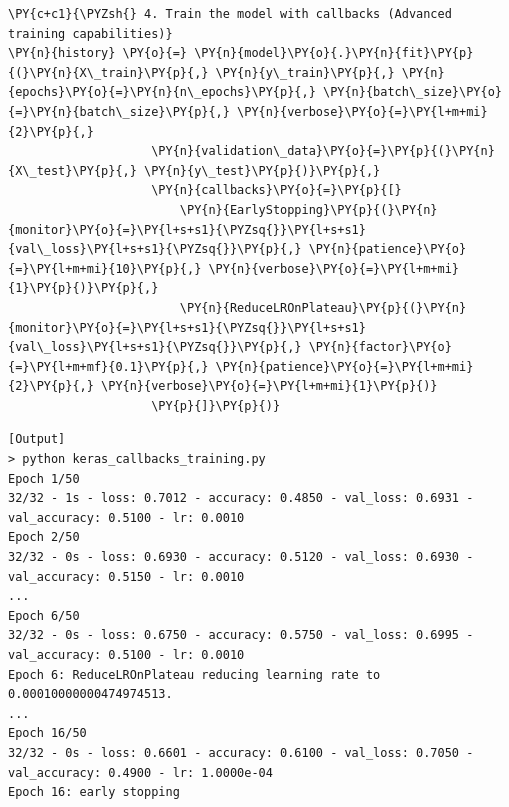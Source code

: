 \begin{Verbatim}[fontsize=\footnotesize, label=\makebox{\url{https://github.com/lucabaldini/cmepda/tree/master/slides/latex/snippets/keras_callbacks_training.py}},commandchars=\\\{\}]
\PY{c+c1}{\PYZsh{} 4. Train the model with callbacks (Advanced training capabilities)}
\PY{n}{history} \PY{o}{=} \PY{n}{model}\PY{o}{.}\PY{n}{fit}\PY{p}{(}\PY{n}{X\_train}\PY{p}{,} \PY{n}{y\_train}\PY{p}{,} \PY{n}{epochs}\PY{o}{=}\PY{n}{n\_epochs}\PY{p}{,} \PY{n}{batch\_size}\PY{o}{=}\PY{n}{batch\_size}\PY{p}{,} \PY{n}{verbose}\PY{o}{=}\PY{l+m+mi}{2}\PY{p}{,}
                    \PY{n}{validation\_data}\PY{o}{=}\PY{p}{(}\PY{n}{X\_test}\PY{p}{,} \PY{n}{y\_test}\PY{p}{)}\PY{p}{,}
                    \PY{n}{callbacks}\PY{o}{=}\PY{p}{[}
                        \PY{n}{EarlyStopping}\PY{p}{(}\PY{n}{monitor}\PY{o}{=}\PY{l+s+s1}{\PYZsq{}}\PY{l+s+s1}{val\_loss}\PY{l+s+s1}{\PYZsq{}}\PY{p}{,} \PY{n}{patience}\PY{o}{=}\PY{l+m+mi}{10}\PY{p}{,} \PY{n}{verbose}\PY{o}{=}\PY{l+m+mi}{1}\PY{p}{)}\PY{p}{,}
                        \PY{n}{ReduceLROnPlateau}\PY{p}{(}\PY{n}{monitor}\PY{o}{=}\PY{l+s+s1}{\PYZsq{}}\PY{l+s+s1}{val\_loss}\PY{l+s+s1}{\PYZsq{}}\PY{p}{,} \PY{n}{factor}\PY{o}{=}\PY{l+m+mf}{0.1}\PY{p}{,} \PY{n}{patience}\PY{o}{=}\PY{l+m+mi}{2}\PY{p}{,} \PY{n}{verbose}\PY{o}{=}\PY{l+m+mi}{1}\PY{p}{)}
                    \PY{p}{]}\PY{p}{)}

\end{Verbatim}

\begin{Verbatim}[fontsize=\footnotesize, label=\makebox{\url{https://github.com/lucabaldini/cmepda/tree/master/slides/latex/snippets/keras_callbacks_trainingb.py}},commandchars=\\\{\}]
[Output]
> python keras_callbacks_training.py
Epoch 1/50
32/32 - 1s - loss: 0.7012 - accuracy: 0.4850 - val_loss: 0.6931 - val_accuracy: 0.5100 - lr: 0.0010
Epoch 2/50
32/32 - 0s - loss: 0.6930 - accuracy: 0.5120 - val_loss: 0.6930 - val_accuracy: 0.5150 - lr: 0.0010
...
Epoch 6/50
32/32 - 0s - loss: 0.6750 - accuracy: 0.5750 - val_loss: 0.6995 - val_accuracy: 0.5100 - lr: 0.0010
Epoch 6: ReduceLROnPlateau reducing learning rate to 0.00010000000474974513.
...
Epoch 16/50
32/32 - 0s - loss: 0.6601 - accuracy: 0.6100 - val_loss: 0.7050 - val_accuracy: 0.4900 - lr: 1.0000e-04
Epoch 16: early stopping
\end{Verbatim}
